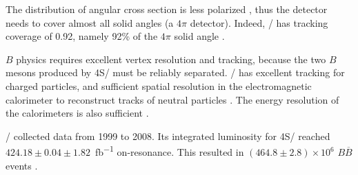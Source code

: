The distribution of angular cross section is less
polarized \cite{Boutigny:1995ib,McGregor:2008ek}, thus the detector needs to
cover almost all solid angles (a $4\pi$ detector).
Indeed, \BaBar/ has tracking coverage of 0.92, namely 92\% of the $4\pi$ solid
angle \cite{Harrison:1998yr}.

$B$ physics requires excellent vertex resolution and tracking, because the two
$B$ mesons produced by \Y4S/ must be reliably separated.
\BaBar/ has excellent tracking for charged particles, and sufficient spatial
resolution in the electromagnetic calorimeter to reconstruct tracks of neutral
particles \cite{Harrison:1998yr}.
The energy resolution of the calorimeters is also sufficient \cite{Bauer:2005}.

\BaBar/ collected data from 1999 to 2008. Its integrated luminosity for \Y4S/
reached $424.18 \pm 0.04 \pm 1.82$~\si{fb^{-1}} on-resonance.
This resulted in $(464.8 \pm 2.8) \times 10^6$ $B \overline{B}$
events \cite{Lees:2013rw}.
